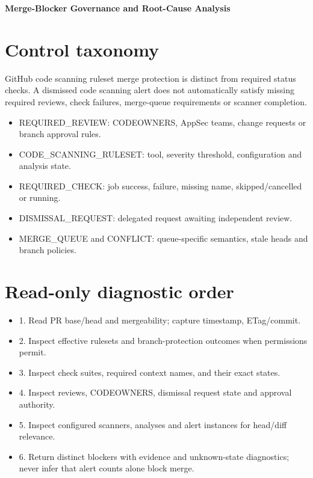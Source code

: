 \documentclass[11pt,letterpaper]{article}
\begin{document}
\begin{center}
{\LARGE\bfseries Merge-Blocker Governance and Root-Cause Analysis}\par
\vspace{5pt}{\large Separate checks, rulesets, review obligations and pending dismissals}\par
\vspace{9pt}{\small Engineering reference | Proposed design | Not a deployment or approval record}\par
\end{center}
\tableofcontents
\clearpage
\section{Control taxonomy}
GitHub code scanning ruleset merge protection is distinct from required status checks. A dismissed code scanning alert does not automatically satisfy missing required reviews, check failures, merge-queue requirements or scanner completion.

\begin{itemize}
\item REQUIRED\_REVIEW: CODEOWNERS, AppSec teams, change requests or branch approval rules.
\item CODE\_SCANNING\_RULESET: tool, severity threshold, configuration and analysis state.
\item REQUIRED\_CHECK: job success, failure, missing name, skipped/cancelled or running.
\item DISMISSAL\_REQUEST: delegated request awaiting independent review.
\item MERGE\_QUEUE and CONFLICT: queue-specific semantics, stale heads and branch policies.
\end{itemize}

\section{Read-only diagnostic order}
\begin{itemize}
\item 1. Read PR base/head and mergeability; capture timestamp, ETag/commit.
\item 2. Inspect effective rulesets and branch-protection outcomes when permissions permit.
\item 3. Inspect check suites, required context names, and their exact states.
\item 4. Inspect reviews, CODEOWNERS, dismissal request state and approval authority.
\item 5. Inspect configured scanners, analyses and alert instances for head/diff relevance.
\item 6. Return distinct blockers with evidence and unknown-state diagnostics; never infer that alert counts alone block merge.
\end{itemize}
\end{document}
